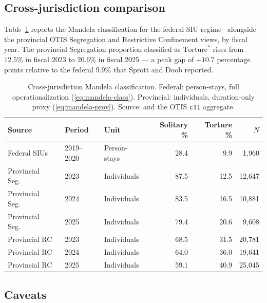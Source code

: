 \documentclass[11pt,a4paper]{article}
\theoremstyle{plain}
\theoremstyle{definition}
\theoremstyle{remark}
\begin{document}
\subsection{Cross-jurisdiction comparison}

Table~\ref{tab:mandela-cross} reports the Mandela
classification for the federal SIU regime~\cite{SprottDoob2021Torture}
alongside the provincial OTIS Segregation and Restrictive
Confinement views, by fiscal year. The provincial Segregation
proportion classified as $\text{Torture}^{\ast}$ rises from
$12.5\%$ in fiscal 2023 to $20.6\%$ in fiscal 2025 --- a peak gap
of $+10.7$ percentage points relative to the federal $9.9\%$
that Sprott and Doob reported.

\begin{table}[ht]
  \caption{Cross-jurisdiction Mandela classification.
           Federal: person-stays, full operationalization
           (\eqref{eq:mandela-class}). Provincial: individuals,
           duration-only proxy (\eqref{eq:mandela-prov}).
           Source: \cite{SprottDoob2021Torture} and the OTIS
           \texttt{c11} aggregate.}
  \label{tab:mandela-cross}
  \centering
  \begin{tabular}{lllrrr}
    \toprule
    Source & Period & Unit & Solitary \% & Torture \% & $N$ \\
    \midrule
    Federal SIUs        & 2019--2020 & Person-stays & 28.4 & 9.9  & 1{,}960 \\
    Provincial Seg.\    & 2023       & Individuals & 87.5 & 12.5 & 12{,}647 \\
    Provincial Seg.\    & 2024       & Individuals & 83.5 & 16.5 & 10{,}881 \\
    Provincial Seg.\    & 2025       & Individuals & 79.4 & 20.6 &  9{,}608 \\
    Provincial RC       & 2023       & Individuals & 68.5 & 31.5 & 20{,}781 \\
    Provincial RC       & 2024       & Individuals & 64.0 & 36.0 & 19{,}641 \\
    Provincial RC       & 2025       & Individuals & 59.1 & 40.9 & 25{,}045 \\
    \bottomrule
  \end{tabular}
\end{table}

\subsection{Caveats}
\end{document}

